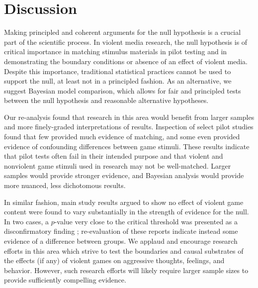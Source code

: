 \documentclass[man]{apa6}
\begin{document}
\section{Discussion} 
Making principled and coherent arguments for the null hypothesis is a crucial part of the scientific process. In violent media research, the null hypothesis is of critical importance in matching stimulus materials in pilot testing and in demonstrating the boundary conditions or absence of an effect of violent media. Despite this importance, traditional statistical practices cannot be used to support the null, at least not in a principled fashion. As an alternative, we suggest Bayesian model comparison, which allows for fair and principled tests between the null hypothesis and reasonable alternative hypotheses.

Our re-analysis found that research in this area would benefit from larger samples and more finely-graded interpretations of results. Inspection of select pilot studies found that few provided much evidence of matching, and some even provided evidence of confounding differences between game stimuli. These results indicate that pilot tests often fail in their intended purpose and that violent and nonviolent game stimuli used in research may not be well-matched. Larger samples would provide stronger evidence, and Bayesian analysis would provide more nuanced, less dichotomous results.

In similar fashion, main study results argued to show no effect of violent game content were found to vary substantially in the strength of evidence for the null. In two cases, a $p$-value very close to the critical threshold was presented as a disconfirmatory finding \citep{Elson:etal:2013,Valadez:Ferguson:2012}; re-evaluation of these reports indicate instead some evidence of a difference between groups. We applaud and encourage research efforts in this area which strive to test the boundaries and causal substrates of the effects (if any) of violent games on aggressive thoughts, feelings, and behavior. However, such research efforts will likely require larger sample sizes to provide sufficiently compelling evidence. 
\end{document}
